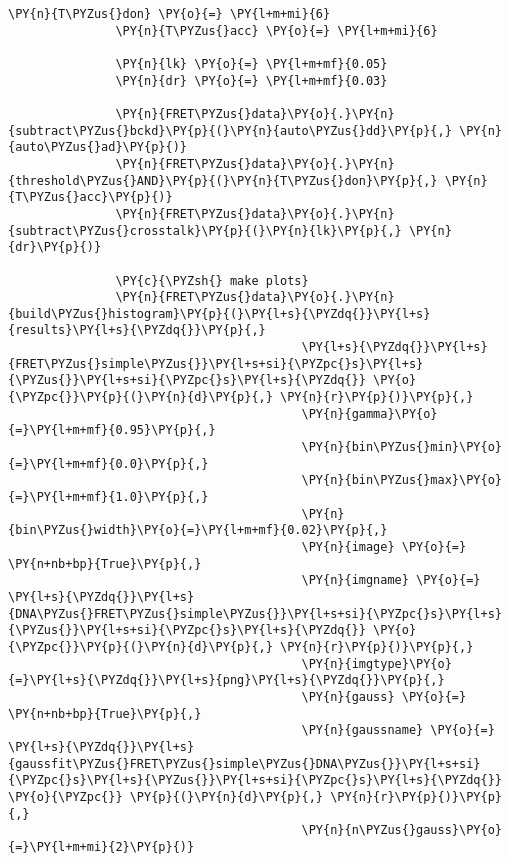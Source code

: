 \begin{Verbatim}[commandchars=\\\{\}, fontsize=\scriptsize]
               \PY{n}{T\PYZus{}don} \PY{o}{=} \PY{l+m+mi}{6}
               \PY{n}{T\PYZus{}acc} \PY{o}{=} \PY{l+m+mi}{6}
               
               \PY{n}{lk} \PY{o}{=} \PY{l+m+mf}{0.05}
               \PY{n}{dr} \PY{o}{=} \PY{l+m+mf}{0.03}
               
               \PY{n}{FRET\PYZus{}data}\PY{o}{.}\PY{n}{subtract\PYZus{}bckd}\PY{p}{(}\PY{n}{auto\PYZus{}dd}\PY{p}{,} \PY{n}{auto\PYZus{}ad}\PY{p}{)}
               \PY{n}{FRET\PYZus{}data}\PY{o}{.}\PY{n}{threshold\PYZus{}AND}\PY{p}{(}\PY{n}{T\PYZus{}don}\PY{p}{,} \PY{n}{T\PYZus{}acc}\PY{p}{)}
               \PY{n}{FRET\PYZus{}data}\PY{o}{.}\PY{n}{subtract\PYZus{}crosstalk}\PY{p}{(}\PY{n}{lk}\PY{p}{,} \PY{n}{dr}\PY{p}{)}
       
               \PY{c}{\PYZsh{} make plots}
               \PY{n}{FRET\PYZus{}data}\PY{o}{.}\PY{n}{build\PYZus{}histogram}\PY{p}{(}\PY{l+s}{\PYZdq{}}\PY{l+s}{results}\PY{l+s}{\PYZdq{}}\PY{p}{,} 
                                         \PY{l+s}{\PYZdq{}}\PY{l+s}{FRET\PYZus{}simple\PYZus{}}\PY{l+s+si}{\PYZpc{}s}\PY{l+s}{\PYZus{}}\PY{l+s+si}{\PYZpc{}s}\PY{l+s}{\PYZdq{}} \PY{o}{\PYZpc{}}\PY{p}{(}\PY{n}{d}\PY{p}{,} \PY{n}{r}\PY{p}{)}\PY{p}{,} 
                                         \PY{n}{gamma}\PY{o}{=}\PY{l+m+mf}{0.95}\PY{p}{,} 
                                         \PY{n}{bin\PYZus{}min}\PY{o}{=}\PY{l+m+mf}{0.0}\PY{p}{,} 
                                         \PY{n}{bin\PYZus{}max}\PY{o}{=}\PY{l+m+mf}{1.0}\PY{p}{,} 
                                         \PY{n}{bin\PYZus{}width}\PY{o}{=}\PY{l+m+mf}{0.02}\PY{p}{,} 
                                         \PY{n}{image} \PY{o}{=} \PY{n+nb+bp}{True}\PY{p}{,} 
                                         \PY{n}{imgname} \PY{o}{=} \PY{l+s}{\PYZdq{}}\PY{l+s}{DNA\PYZus{}FRET\PYZus{}simple\PYZus{}}\PY{l+s+si}{\PYZpc{}s}\PY{l+s}{\PYZus{}}\PY{l+s+si}{\PYZpc{}s}\PY{l+s}{\PYZdq{}} \PY{o}{\PYZpc{}}\PY{p}{(}\PY{n}{d}\PY{p}{,} \PY{n}{r}\PY{p}{)}\PY{p}{,} 
                                         \PY{n}{imgtype}\PY{o}{=}\PY{l+s}{\PYZdq{}}\PY{l+s}{png}\PY{l+s}{\PYZdq{}}\PY{p}{,} 
                                         \PY{n}{gauss} \PY{o}{=} \PY{n+nb+bp}{True}\PY{p}{,} 
                                         \PY{n}{gaussname} \PY{o}{=} \PY{l+s}{\PYZdq{}}\PY{l+s}{gaussfit\PYZus{}FRET\PYZus{}simple\PYZus{}DNA\PYZus{}}\PY{l+s+si}{\PYZpc{}s}\PY{l+s}{\PYZus{}}\PY{l+s+si}{\PYZpc{}s}\PY{l+s}{\PYZdq{}} \PY{o}{\PYZpc{}} \PY{p}{(}\PY{n}{d}\PY{p}{,} \PY{n}{r}\PY{p}{)}\PY{p}{,} 
                                         \PY{n}{n\PYZus{}gauss}\PY{o}{=}\PY{l+m+mi}{2}\PY{p}{)}
               
\end{Verbatim}
